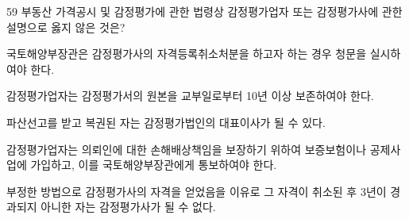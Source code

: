 \begin{question}{59}
부동산 가격공시 및 감정평가에 관한 법령상 감정평가업자 또는 감정평가사에 관한 설명으로 옳지 않은 것은?
\begin{choices}
  \item 국토해양부장관은 감정평가사의 자격등록취소처분을 하고자 하는 경우 청문을 실시하여야 한다.
  \item 감정평가업자는 감정평가서의 원본을 교부일로부터 10년 이상 보존하여야 한다.
  \item 파산선고를 받고 복권된 자는 감정평가법인의 대표이사가 될 수 있다.
  \item 감정평가업자는 의뢰인에 대한 손해배상책임을 보장하기 위하여 보증보험이나 공제사업에 가입하고, 이를 국토해양부장관에게 통보하여야 한다.
  \item 부정한 방법으로 감정평가사의 자격을 얻었음을 이유로 그 자격이 취소된 후 3년이 경과되지 아니한 자는 감정평가사가 될 수 없다.
\end{choices}
\end{question}
